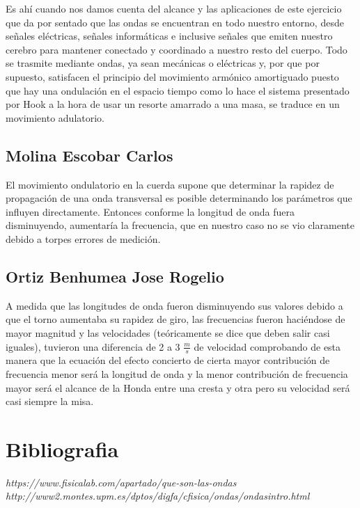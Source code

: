 \documentclass[11pt]{article}
\begin{document}
\begin{multicols}{2}
		Es ahí cuando nos damos cuenta del alcance y las aplicaciones de este ejercicio que da por sentado que las ondas se encuentran en todo nuestro entorno, desde señales eléctricas, señales informáticas e inclusive señales que emiten nuestro cerebro para mantener conectado y coordinado a nuestro resto del cuerpo. Todo se trasmite mediante ondas, ya sean mecánicas o eléctricas y, por que por supuesto, satisfacen el principio del movimiento armónico amortiguado puesto que hay una ondulación en el espacio tiempo como lo hace el sistema presentado por Hook a la hora de usar un resorte amarrado a una masa, se traduce en un movimiento adulatorio. 

	\subsection{Molina Escobar Carlos}

		El movimiento ondulatorio en la cuerda supone que determinar la rapidez de propagación de una onda transversal es posible determinando los parámetros que influyen directamente. Entonces conforme la longitud de onda fuera disminuyendo, aumentaría la frecuencia, que en nuestro caso no se vio claramente debido a torpes errores de medición.

	\subsection{Ortiz Benhumea Jose Rogelio}

		A medida que las longitudes de onda fueron disminuyendo sus valores debido a que el torno aumentaba su rapidez de giro, las frecuencias fueron haciéndose de mayor magnitud y las velocidades (teóricamente se dice que deben salir casi iguales), tuvieron una diferencia de 2 a 3 $\frac{m}{s}$ de velocidad comprobando de esta manera que la ecuación del efecto concierto de cierta mayor contribución de frecuencia menor será la longitud de onda y la menor contribución de frecuencia mayor será el alcance de la Honda entre una cresta y otra pero su velocidad será casi siempre la misa.

\section{Bibliografia}

	\textit{https://www.fisicalab.com/apartado/que-son-las-ondas}
	\textit{http://www2.montes.upm.es/dptos/digfa/cfisica/ondas/ondasintro.html}


\end{multicols}
\end{document}
